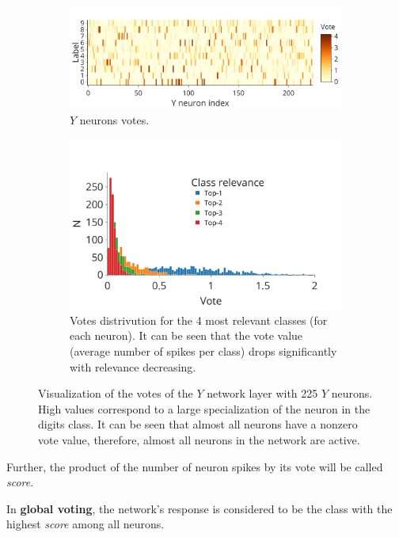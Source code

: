 \documentclass[a4paper,10pt]{article}
\begin{document}
\begin{figure}
\centering
\begin{subfigure}{\textwidth}
    \includegraphics[width=\textwidth,keepaspectratio=true]{votes.pdf}
    \caption{$Y$ neurons votes.}
\end{subfigure}
\begin{subfigure}{\textwidth} 
    \includegraphics[width=\textwidth,keepaspectratio=true]{votes_distr_4.pdf} 
    \caption{Votes distrivution for the 4 most relevant classes (for each neuron). It can be seen that the vote value (average number of spikes per class) drops significantly with relevance decreasing.}
\end{subfigure}
\caption{Visualization of the votes of the $ Y $ network layer with 225 $ Y $ neurons. High values correspond to a large specialization of the neuron in the digits class. It can be seen that almost all neurons have a nonzero vote value, therefore, almost all neurons in the network are active.}
\label{fig:votes}
\end{figure}

Further, the product of the number of neuron spikes by its vote will be called \textit{score}.

In \textbf{global voting}, the network's response is considered to be the class with the highest \textit{score} among all neurons.
\end{document}
